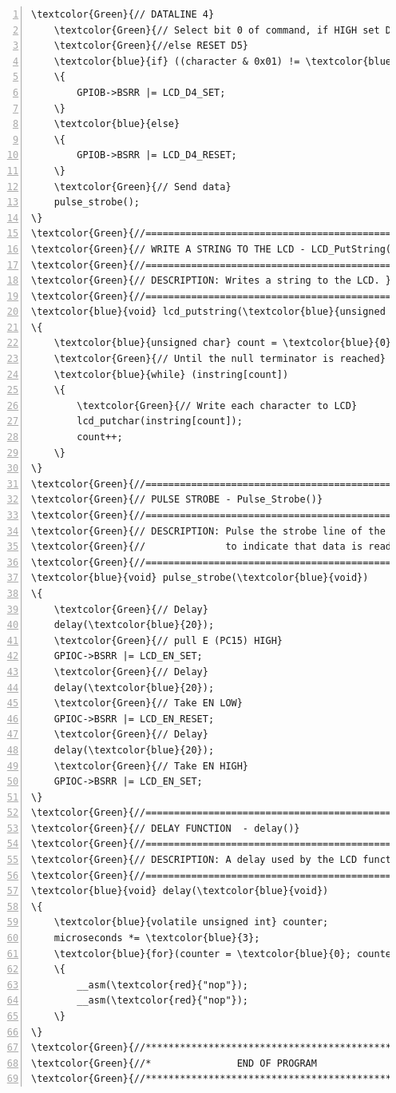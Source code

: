 \begin{Verbatim}[fontfamily=courier,fontsize=\small, numbers=left,commandchars=\\\{\}]
	\textcolor{Green}{// DATALINE 4}
	\textcolor{Green}{// Select bit 0 of command, if HIGH set Data line 5 (D5) }
	\textcolor{Green}{//else RESET D5}
	\textcolor{blue}{if} ((character & 0x01) != \textcolor{blue}{0})		           
	\{
		GPIOB->BSRR |= LCD_D4_SET;
	\}
	\textcolor{blue}{else}
	\{
		GPIOB->BSRR |= LCD_D4_RESET;
	\}       
	\textcolor{Green}{// Send data}
	pulse_strobe();                          
\}
\textcolor{Green}{//=================================================}
\textcolor{Green}{// WRITE A STRING TO THE LCD - LCD_PutString(ptr_String)}
\textcolor{Green}{//=================================================}
\textcolor{Green}{// DESCRIPTION: Writes a string to the LCD. }
\textcolor{Green}{//=================================================}
\textcolor{blue}{void} lcd_putstring(\textcolor{blue}{unsigned char}* instring)           
\{
	\textcolor{blue}{unsigned char} count = \textcolor{blue}{0};
	\textcolor{Green}{// Until the null terminator is reached}
	\textcolor{blue}{while} (instring[count]) 
	\{
		\textcolor{Green}{// Write each character to LCD}
		lcd_putchar(instring[count]);         
		count++;
	\}                             
\}
\textcolor{Green}{//=================================================}
\textcolor{Green}{// PULSE STROBE - Pulse_Strobe()}
\textcolor{Green}{//=================================================}
\textcolor{Green}{// DESCRIPTION: Pulse the strobe line of the LCD }
\textcolor{Green}{//              to indicate that data is ready.}
\textcolor{Green}{//=================================================}
\textcolor{blue}{void} pulse_strobe(\textcolor{blue}{void})
\{
	\textcolor{Green}{// Delay}
	delay(\textcolor{blue}{20});                                  
	\textcolor{Green}{// pull E (PC15) HIGH}
	GPIOC->BSRR |= LCD_EN_SET;			      
	\textcolor{Green}{// Delay}
	delay(\textcolor{blue}{20});                                  
	\textcolor{Green}{// Take EN LOW}
	GPIOC->BSRR |= LCD_EN_RESET;             
	\textcolor{Green}{// Delay}
	delay(\textcolor{blue}{20});                                 
	\textcolor{Green}{// Take EN HIGH}
	GPIOC->BSRR |= LCD_EN_SET;                
\}
\textcolor{Green}{//=================================================}
\textcolor{Green}{// DELAY FUNCTION  - delay()}
\textcolor{Green}{//=================================================}
\textcolor{Green}{// DESCRIPTION: A delay used by the LCD functions. }
\textcolor{Green}{//=================================================}
\textcolor{blue}{void} delay(\textcolor{blue}{void})           
\{
	\textcolor{blue}{volatile unsigned int} counter;
	microseconds *= \textcolor{blue}{3};
	\textcolor{blue}{for}(counter = \textcolor{blue}{0}; counter<microseconds; counter++)
	\{
		__asm(\textcolor{red}{"nop"});
		__asm(\textcolor{red}{"nop"});
	\}                               
\}
\textcolor{Green}{//*************************************************}
\textcolor{Green}{//*               END OF PROGRAM                  *}
\textcolor{Green}{//*************************************************}		
\end{Verbatim}

